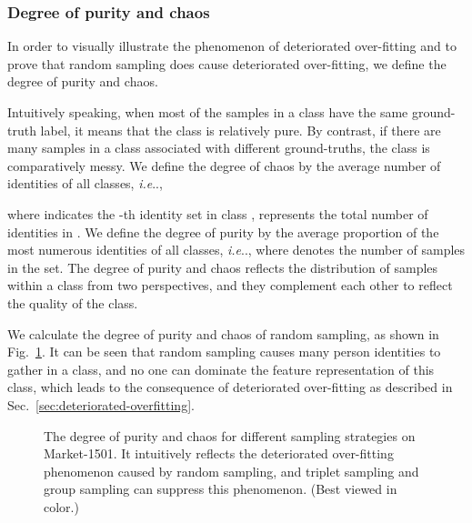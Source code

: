 \documentclass[lettersize,journal]{IEEEtran}
\makeatletter
\DeclareRobustCommand\onedot{\futurelet\@let@token\@onedot}
\def\@onedot{\ifx\@let@token.\else.\null\fi\xspace}
\def\ie{\emph{i.e}\onedot} \def\Ie{\emph{I.e}\onedot}
\makeatother
\begin{document}
\subsubsection{Degree of purity and chaos} \label{sec:purity-chaos}
In order to visually illustrate the phenomenon of deteriorated over-fitting and to prove that random sampling does cause deteriorated over-fitting, we define the degree of purity and chaos.

Intuitively speaking, when most of the samples in a class have the same ground-truth label, it means that the class is relatively pure. By contrast, if there are many samples in a class associated with different ground-truths, the class is comparatively messy. 
We define the degree of chaos  by the average number of identities of all classes, \ie,

where  indicates the -th identity set in class ,  represents the total number of identities in .
We define the degree of purity  by the average proportion of the most numerous identities of all classes, \ie,
where  denotes the number of samples in the set. The degree of purity and chaos reflects the distribution of samples within a class from two perspectives, and they complement each other to reflect the quality of the class. 

We calculate the degree of purity and chaos of random sampling, as shown in Fig.~\ref{fig:purity-chaos}. It can be seen that random sampling causes many person identities to gather in a class, and no one can dominate the feature representation of this class, which leads to the consequence of deteriorated over-fitting as described in Sec.~\ref{sec:deteriorated-overfitting}.

\begin{figure}[t]
\begin{center}
\caption{The degree of purity and chaos for different sampling strategies on Market-1501. It intuitively reflects the deteriorated over-fitting phenomenon caused by random sampling, and triplet sampling and group sampling can suppress this phenomenon. (Best viewed in color.)}
\label{fig:purity-chaos}
\end{center}
\end{figure}
\end{document}
